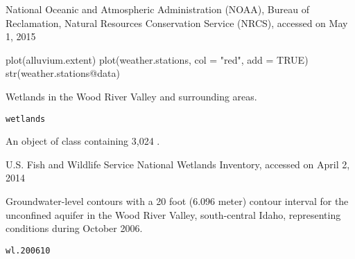 \documentclass[a4paper]{book}
\begin{document}
%
\begin{Source}\relax
National Oceanic and Atmospheric Administration (NOAA), Bureau of Reclamation, Natural Resources Conservation Service (NRCS), accessed on May 1, 2015
\end{Source}
%
\begin{Examples}
\begin{ExampleCode}
plot(alluvium.extent)
plot(weather.stations, col = "red", add = TRUE)
str(weather.stations@data)
\end{ExampleCode}
\end{Examples}
%
\begin{Description}\relax
Wetlands in the Wood River Valley and surrounding areas.
\end{Description}
%
\begin{Usage}
\begin{verbatim}
wetlands
\end{verbatim}
\end{Usage}
%
\begin{Format}
An object of  class containing 3,024 .
\end{Format}
%
\begin{Source}\relax
U.S. Fish and Wildlife Service National Wetlands Inventory, accessed on April 2, 2014
\end{Source}
%
\begin{Examples}
\end{Examples}
%
\begin{Description}\relax
Groundwater-level contours with a 20 foot (6.096 meter) contour interval for the unconfined aquifer in the Wood River Valley, south-central Idaho, representing conditions during October 2006.
\end{Description}
%
\begin{Usage}
\begin{verbatim}
wl.200610
\end{verbatim}
\end{Usage}
%
\end{document}
